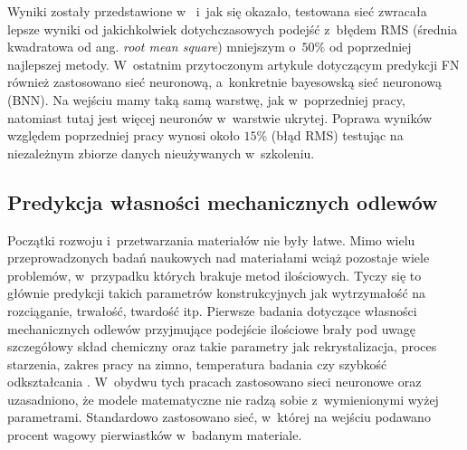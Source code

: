 Wyniki zostały przedstawione w~\cite{Vitek03.II} i~jak się okazało, testowana sieć zwracała lepsze wyniki od jakichkolwiek dotychczasowych podejść z~błędem RMS (średnia kwadratowa od ang. \textit{root mean square}) mniejszym o~$50\%$ od poprzedniej najlepszej metody. 
    W~ostatnim przytoczonym artykule dotyczącym predykcji FN \cite{Vasudevan13} również zastosowano sieć neuronową, a~konkretnie bayesowską sieć neuronową (BNN). Na wejściu mamy taką samą warstwę, jak w~poprzedniej pracy, natomiast tutaj jest więcej neuronów w~warstwie ukrytej. Poprawa wyników względem poprzedniej pracy wynosi około $15\%$ (błąd RMS) testując na niezależnym zbiorze danych nieużywanych w~szkoleniu.

\subsection{Predykcja własności mechanicznych odlewów}
\label{sub:predykcja.1}

Początki rozwoju i~przetwarzania materiałów nie były łatwe. Mimo wielu przeprowadzonych badań naukowych nad materiałami wciąż pozostaje wiele problemów, w~przypadku których brakuje metod ilościowych. Tyczy się to głównie predykcji takich parametrów konstrukcyjnych jak wytrzymałość na rozciąganie, trwałość, twardość itp. Pierwsze badania dotyczące własności mechanicznych odlewów przyjmujące podejście ilościowe brały pod uwagę szczegółowy skład chemiczny oraz takie parametry jak rekrystalizacja, proces starzenia, zakres pracy na zimno, temperatura badania czy szybkość odkształcania \cite{Bhadeshia07, Badmos13}. W~obydwu tych pracach zastosowano sieci neuronowe oraz uzasadniono, że modele matematyczne nie radzą sobie z~wymienionymi wyżej parametrami. Standardowo zastosowano sieć, w~której na wejściu podawano procent wagowy pierwiastków w~badanym materiale. 

